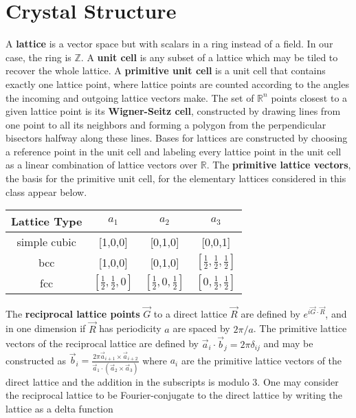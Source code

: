 \documentclass[10pt]{article}
\begin{document}


\section*{Crystal Structure}
A \textbf{lattice} is a vector space but with scalars in a ring instead of a field.
In our case, the ring is $\mathbb{Z}$. A \textbf{unit cell} is any subset of a lattice which may be tiled to recover the whole lattice.
A \textbf{primitive unit cell} is a unit cell that contains exactly one lattice point,
where lattice points are counted according to the angles the incoming and outgoing lattice vectors make.
The set of $\mathbb{R}^n$ points closest to a given lattice point is its \textbf{Wigner-Seitz cell},
constructed by drawing lines from one point to all its neighbors and forming a polygon from the perpendicular bisectors halfway along these lines.
Bases for lattices are constructed by choosing a reference point in the unit cell and labeling every lattice point in the unit cell as a linear combination of lattice vectors over $\mathbb{R}$.
The \textbf{primitive lattice vectors}, the basis for the primitive unit cell, for the elementary lattices considered in this class appear below.
\begin{center}
  \begin{tabular}{ |c|c|c|c| }
    \hline
    Lattice Type & $a_{1}$ & $a_{2}$ & $a_{3}$ \\
    \hline
    \hline
    simple cubic & [1,0,0] & [0,1,0] & [0,0,1] \\
    \hline
    bcc & [1,0,0] & [0,1,0] & $[\frac{1}{2},\frac{1}{2},\frac{1}{2}]$ \\
    \hline
    fcc & $[\frac{1}{2},\frac{1}{2},0]$ & $[\frac{1}{2},0,\frac{1}{2}]$ & $[0,\frac{1}{2},\frac{1}{2}]$ \\
    \hline
  \end{tabular}
\end{center}
The \textbf{reciprocal lattice points} $\vec{G}$ to a direct lattice $\vec{R}$ are defined by
$e^{i\vec{G}\cdot\vec{R}}$, and in one dimension if $\vec{R}$ has periodicity $a$ are spaced by $2\pi/a$.
The primitive lattice vectors of the reciprocal lattice are defined by $\vec{a}_{i}\cdot\vec{b}_{j}=2\pi\delta_{ij}$
and may be constructed as
$\vec{b}_{i}=\frac{2\pi \vec{a}_{i+1}\times\vec{a}_{i+2}}{\vec{a}_{1}\cdot(\vec{a}_{2}\times\vec{a}_{3})}$
where $a_{i}$ are the primitive lattice vectors of the direct lattice and the addition in the subscripts is modulo 3.
One may consider the reciprocal lattice to be Fourier-conjugate to the direct lattice by writing the lattice as a delta function
\end{document}
